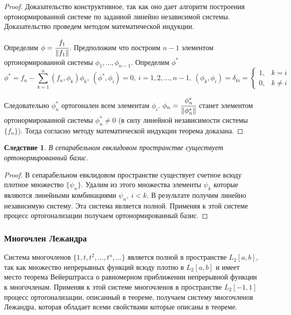\documentclass[14pt]{extarticle}
\newtheorem{corollary}{Следствие}[theorem]
\theoremstyle{definition}
\theoremstyle{remark}
\renewcommand{\[}{\begin{dmath*}[compact]}
\renewcommand{\]}{\end{dmath*}}
\newcommand{\sep}{ , \ \allowbreak }
\begin{document}
\begin{proof}
  Доказательство конструктивное, так как оно дает алгоритм построения
  ортонормированной системе по заданной линейно независимой системы.
  Доказательство проведем методом математической индукции.

  Определим $\phi = \cfrac{f_1}{\Vert f_1 \Vert}$.
  Предположим что построим $n-1$ элементом ортонормированной системы
  $\phi_1, \dots, \phi_{n-1}$. Определим $\phi^*$
  \[\phi^* = f_n - \sum_{k=1}^n (f_n,\phi_k) \phi_k \sep
  {(\phi^* , \phi_i) = 0} \sep {i=1,2,\dots, n-1} \sep
  (\phi_k, \phi_i) = \delta_{ki} \allowbreak
  = \begin{cases} 1, & k=i \\ 0, & k\neq i \end{cases}\]

  Следовательно $\phi_n^*$ ортогонален всем элементам $\phi_i$.
  $\phi_n = \cfrac{\phi_n^*}{\Vert \phi_n^* \Vert}$
  станет элементом ортонормированной системы $\phi_n^* \neq 0$
  (в силу линейной независимости системы $\{f_n\}$).
  Тогда согласно методу математической индукции теорема доказана.
\end{proof}

\begin{corollary}
В сепарабельном евклидовом пространстве существует ортонормированный базис.
\end{corollary}

\begin{proof}
В сепарабельном евклидовом пространстве существует счетное всюду
плотное множество $\{\psi_n\}$.
Удалим из этого множества элементы $\psi_k$ которые являются
линейными комбинациями $\psi_n \sep i<k$. В результате получим
линейно независимую систему.
Эта система является полной.
Применяя к этой системе процесс ортогонализации получаем
ортонормированный базис.
\end{proof}

\subsubsection{Многочлен Лежандра}

Система многочленов $\{1,t,t^2,\dots, t^n,\dots\}$ является полной
в пространстве $L_2[a,b]$,
так как множество непрерывных функций всюду плотно в $L_2[a,b]$ и имеет
место теорема Вейерштрасса о равномерном приближении непрерывной
функции к многочленам.
Применяя к этой системе многочленов в пространстве $L_2[-1,1]$ процесс
ортогонализации, описанный в теореме, получаем систему многочленов Лежандра,
которая обладает всеми свойствами которые описаны в теореме.
\end{document}

